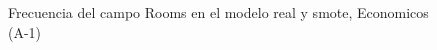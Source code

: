 \begin{figure}[H]
    \centering
    
    \caption{Frecuencia del campo Rooms en el modelo real y smote, Economicos (A-1)}
    \label{frecuency-Rooms-smote-enc}
\end{figure}